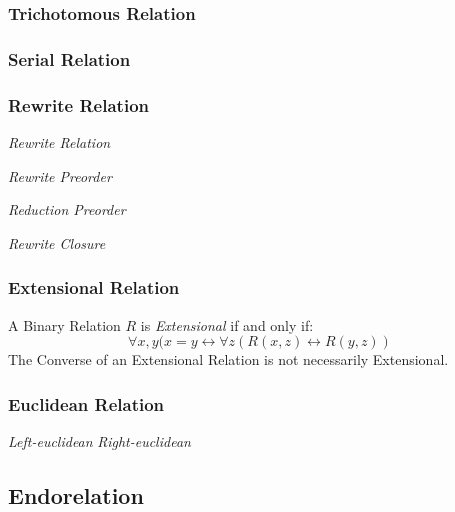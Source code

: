 \subsubsection{Trichotomous Relation}\label{sec:trichotomous_relation}

\subsubsection{Serial Relation}\label{sec:serial_relation}

\subsubsection{Rewrite Relation}\label{sec:rewrite_relation}

\emph{Rewrite Relation}

\emph{Rewrite Preorder}

\emph{Reduction Preorder}

\emph{Rewrite Closure}



\subsubsection{Extensional Relation}\label{sec:extensional_relation}

A Binary Relation $R$ is \emph{Extensional} if and only if:
\[
  \forall x,y (x = y \leftrightarrow
    \forall z (R(x,z) \leftrightarrow R(y,z))
\]
The Converse of an Extensional Relation is not necessarily
Extensional.

\subsubsection{Euclidean Relation}\label{sec:euclidean_relation}

\emph{Left-euclidean} \emph{Right-euclidean}



\subsection{Endorelation}\label{sec:endorelation}


